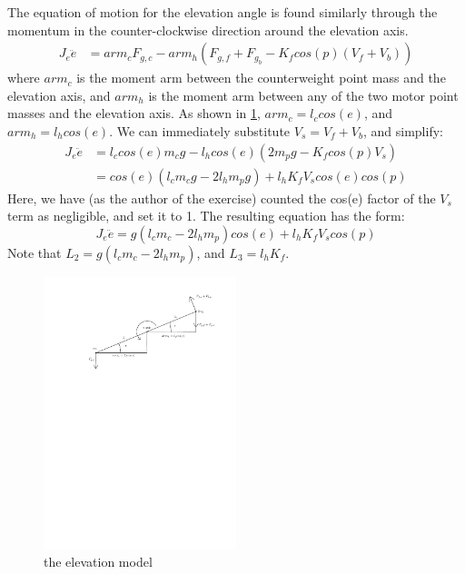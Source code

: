 The equation of motion for the elevation angle is found similarly through the momentum in the counter-clockwise direction around the elevation axis.
\begin{align*}
J_e\ddot{e} &= arm_cF_{g,c} - arm_h(F_{g,f}+F_{g_b} - K_fcos(p)(V_f + V_b))
\end{align*}
where $arm_c$ is the moment arm between the counterweight point mass and the elevation axis, and $arm_h$ is the moment arm between any of the two motor point masses and the elevation axis. As shown in \cref{fig:elevation_model}, $arm_c = l_ccos(e)$, and $arm_h = l_hcos(e)$.  We can immediately substitute $V_s = V_f + V_b$, and simplify:
\begin{align*}
J_e\ddot{e} &= l_ccos(e)m_cg - l_hcos(e)(2m_pg - K_fcos(p)V_s) \\
						&= cos(e)(l_cm_cg - 2l_hm_pg) + l_hK_fV_scos(e)cos(p)
\end{align*}
 Here, we have (as the author of the exercise) counted the cos(e) factor of the $V_s$ term as negligible, and set it to 1.  The resulting equation has the form:
\begin{equation}
J_e\ddot{e} = g(l_cm_c - 2l_hm_p)cos(e) + l_hK_fV_scos(p)
\end{equation}
Note that $L_2 = g(l_cm_c-2l_hm_p)$, and $L_3 = l_hK_f$.

\begin{figure}[H]
\caption{the elevation model}
\label{fig:elevation_model}
\includegraphics[width=0.5\textwidth]{images/elevation_model}
\end{figure}

